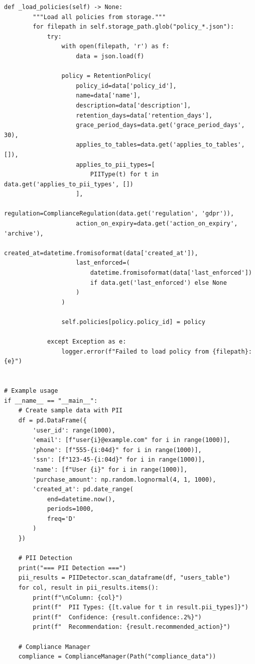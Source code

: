 \begin{lstlisting}[style=python, caption={Comprehensive data privacy compliance framework}]
    def _load_policies(self) -> None:
        """Load all policies from storage."""
        for filepath in self.storage_path.glob("policy_*.json"):
            try:
                with open(filepath, 'r') as f:
                    data = json.load(f)

                policy = RetentionPolicy(
                    policy_id=data['policy_id'],
                    name=data['name'],
                    description=data['description'],
                    retention_days=data['retention_days'],
                    grace_period_days=data.get('grace_period_days', 30),
                    applies_to_tables=data.get('applies_to_tables', []),
                    applies_to_pii_types=[
                        PIIType(t) for t in data.get('applies_to_pii_types', [])
                    ],
                    regulation=ComplianceRegulation(data.get('regulation', 'gdpr')),
                    action_on_expiry=data.get('action_on_expiry', 'archive'),
                    created_at=datetime.fromisoformat(data['created_at']),
                    last_enforced=(
                        datetime.fromisoformat(data['last_enforced'])
                        if data.get('last_enforced') else None
                    )
                )

                self.policies[policy.policy_id] = policy

            except Exception as e:
                logger.error(f"Failed to load policy from {filepath}: {e}")


# Example usage
if __name__ == "__main__":
    # Create sample data with PII
    df = pd.DataFrame({
        'user_id': range(1000),
        'email': [f"user{i}@example.com" for i in range(1000)],
        'phone': [f"555-{i:04d}" for i in range(1000)],
        'ssn': [f"123-45-{i:04d}" for i in range(1000)],
        'name': [f"User {i}" for i in range(1000)],
        'purchase_amount': np.random.lognormal(4, 1, 1000),
        'created_at': pd.date_range(
            end=datetime.now(),
            periods=1000,
            freq='D'
        )
    })

    # PII Detection
    print("=== PII Detection ===")
    pii_results = PIIDetector.scan_dataframe(df, "users_table")
    for col, result in pii_results.items():
        print(f"\nColumn: {col}")
        print(f"  PII Types: {[t.value for t in result.pii_types]}")
        print(f"  Confidence: {result.confidence:.2%}")
        print(f"  Recommendation: {result.recommended_action}")

    # Compliance Manager
    compliance = ComplianceManager(Path("compliance_data"))


\end{lstlisting}
